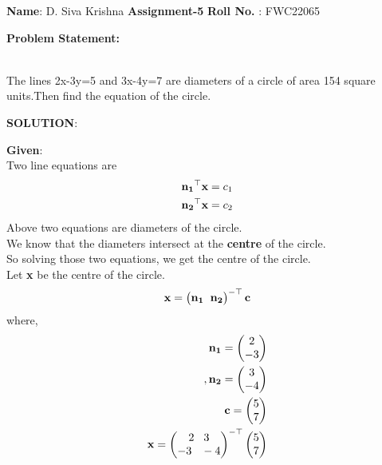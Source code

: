 \documentclass[10pt,a4paper]{report}
\newcommand{\myvec}[1]{\ensuremath{\begin{pmatrix}#1\end{pmatrix}}}
\let\vec\mathbf
\let\vec\mathbf
\begin{document}
\raggedright \textbf{Name}:\hspace{1mm} D. Siva Krishna \hspace{3cm} \Large \textbf{Assignment-5}\hspace{2.5cm} %
\normalsize \textbf{Roll No.} :\hspace{1mm} FWC22065\vspace{1cm}
\begin{multicols}{2}

\raggedright \textbf{Problem Statement:}\vspace{2mm}
\raggedright \\The lines 2x-3y=5 and 3x-4y=7 are diameters of a circle of area 154 square units.Then find the equation of the circle. \\
\vspace{5mm}
\raggedright \textbf{SOLUTION}:\vspace{2mm}\\

\raggedright \textbf{Given}:\vspace{2mm}\\
Two line equations are \\\vspace{1mm}
\begin{align}
\vspace{1mm}
\vec{n_1}^\top\textbf{x}={c_1}
\\
\vec{n_2}^\top\textbf{x}={c_2}
\end{align}
Above two equations are diameters of the circle.\\ \vspace{1mm}
We know that the diameters intersect at the \textbf{centre} of the circle.\\
So solving those two equations, we get the centre of the circle.
\\
Let \textbf{x} be the centre of the circle.
\begin{align}
 \textbf{x} = 
 \myvec{
\vec{n_1} \hspace{2mm} \vec{n_2} \\
}^{-\top}\vec{c}
\end{align}
where,
\begin{align}
\vec{n_1}=\myvec{2 \\ -3}\\ ,\vec{n_2}=\myvec{3 \\-4}\\ \textbf{c}=\myvec{5 \\7}
\\
 \textbf{x} =
 \myvec{
2 \hspace{3mm} 3 \\
-3 \hspace{3mm} -4 \\
}^{-\top}
\myvec{
      5\\
      7
  }
\end{align}


\end{multicols}
\end{document}
